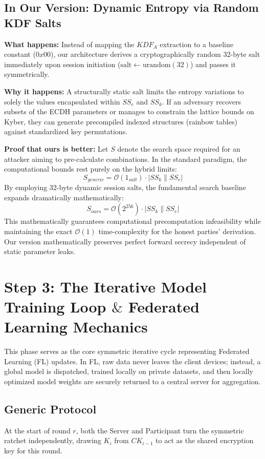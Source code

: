 \documentclass[12pt]{article}
\begin{document}
\subsection*{In Our Version: Dynamic Entropy via Random KDF Salts}
\textbf{What happens:} Instead of mapping the $KDF_A$ extraction to a baseline constant ($0x00$), our architecture derives a cryptographically random 32-byte salt immediately upon session initiation ($\text{salt} \leftarrow \text{urandom}(32)$) and passes it symmetrically.

\textbf{Why it happens:} A structurally static salt limits the entropy variations to solely the values encapsulated within $SS_e$ and $SS_k$. If an adversary recovers subsets of the ECDH parameters or manages to constrain the lattice bounds on Kyber, they can generate precompiled indexed structures (rainbow tables) against standardized key permutations.

\textbf{Proof that ours is better:} 
Let $S$ denote the search space required for an attacker aiming to pre-calculate combinations. In the standard paradigm, the computational bounds rest purely on the hybrid limits:
\[
S_{generic} = \mathcal{O}(1_{salt}) \cdot |SS_k \parallel SS_e|
\]
By employing 32-byte dynamic session salts, the fundamental search baseline expands dramatically mathematically:
\[
S_{ours} = \mathcal{O}(2^{256}) \cdot |SS_k \parallel SS_e|
\]
This mathematically guarantees computational precomputation infeasibility while maintaining the exact $\mathcal{O}(1)$ time-complexity for the honest parties' derivation. Our version mathematically preserves perfect forward secrecy independent of static parameter leaks.

\section*{Step 3: The Iterative Model Training Loop $\&$ Federated Learning Mechanics}

This phase serves as the core symmetric iterative cycle representing Federated Learning (FL) updates. In FL, raw data never leaves the client devices; instead, a global model is dispatched, trained locally on private datasets, and then locally optimized model weights are securely returned to a central server for aggregation. 

\subsection*{Generic Protocol}
At the start of round $r$, both the Server and Participant turn the symmetric ratchet independently, drawing $K_i$ from $CK_{i-1}$ to act as the shared encryption key for this round.
\end{document}

